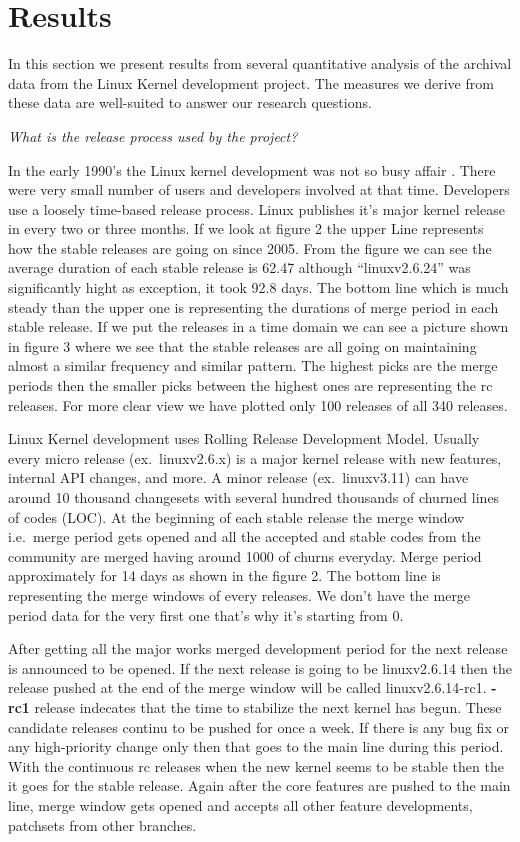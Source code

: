 \documentclass{acm_proc_article-sp}
\begin{document}
\section{Results}
In this section we present results from several quantitative analysis of the archival data from the Linux Kernel development project. The measures we derive from these data are well-suited to answer our research questions.

\textit{What is the release process used by the project?}

In the early 1990's the Linux kernel development was not so busy affair \cite{linux_kernel}. There were very small number of users and developers involved at that time. Developers use a loosely time-based release process. Linux publishes it's major kernel release in every two or three months. If we look at figure 2 the upper Line represents how the stable releases are going on since 2005. From the figure we can see the average duration of each stable release is 62.47 although ``linuxv2.6.24'' was significantly hight as exception, it took 92.8 days. The bottom line which is much steady than the upper one is representing the durations of merge period in each stable release. If we put the releases in a time domain we can see a picture shown in figure 3 where we see that the stable releases are all going on maintaining almost a similar frequency and similar pattern. The highest picks are the merge periods then the smaller picks between the highest ones are representing the rc releases. For more clear view we have plotted only 100 releases of all 340 releases.

Linux Kernel development uses Rolling Release Development Model. Usually every micro release (ex.\ linuxv2.6.x) is a major kernel release with new features, internal API changes, and more. A minor release (ex.\ linuxv3.11) can have around  10 thousand changesets with several hundred thousands of churned lines of  codes (LOC). At the beginning of each stable release the merge window i.e.\ merge period gets opened and all the accepted and stable codes from the community are merged having around 1000 of churns everyday. Merge period approximately for 14 days as shown in the figure 2. The bottom line is representing the merge windows of every releases. We don't have the merge period data for the very first one that's why it's starting from 0.

After getting all the major works merged development period for the next release is announced to be opened. If the next release is going to be linuxv2.6.14 then the release pushed at the end of the merge window will be called linuxv2.6.14-rc1. \textbf{-rc1} release indecates that the time to stabilize the next kernel has begun. These candidate releases continu to be pushed for once a week. If there is any bug fix or any high-priority change only then that goes to the main line during this period. With the continuous rc releases when the new kernel seems to be stable then the it goes for the stable release. Again after the core features are pushed to the main line, merge window gets opened and accepts all other feature developments, patchsets from other branches.
\end{document}
